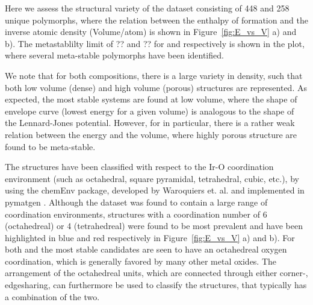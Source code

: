 %
Here we assess the structural variety of the dataset consisting of 448 \IrOtwo and 258 \IrOthree unique polymorphs,
where the relation between the enthalpy of formation and the inverse atomic density (Volume/atom) is shown in Figure~\ref{fig:E_vs_V} a) and b).
%
The metastablilty limit of ?? and ?? for \IrOtwo and \IrOthree respectively is shown in the plot,
where several meta-stable polymorphs have been identified.


We note that for both compositions,
there is a large variety in density,
such that both low volume (dense) and high volume (porous) structures are represented.
%
As expected, the most stable systems are found at low volume,
where the shape of envelope curve (lowest energy for a given volume) is analogous to the shape of the Lennard-Jones potential.
%
However, for \IrOthree in particular,
there is a rather weak relation between the energy and the volume,
where highly porous structure are found to be meta-stable.


%
The structures have been classified with respect to the Ir-O coordination environment
(such as octahedral, square pyramidal, tetrahedral, cubic, etc.),
by using the chemEnv package, developed by Waroquiers et. al. \cite{Waroquiers2017} and implemented in pymatgen \cite{Ong2013}.
%
Although the dataset was found to contain a large range of coordination environments, structures with a coordination number of 6 (octahedreal) or 4 (tetrahedreal) were found to be most prevalent and have been highlighted in blue and red respectively in Figure~\ref{fig:E_vs_V} a) and b).
%
For both \IrOtwo and \IrOthree the most stable candidates are seen to have an octahedreal oxygen coordination, which is generally favored by many other metal oxides. \cite{Waroquiers2017}
%
The arrangement of the octahedreal units, which are connected through either corner-, edgesharing, can furthermore be used to classify the structures, that typically has a combination of the two. 


